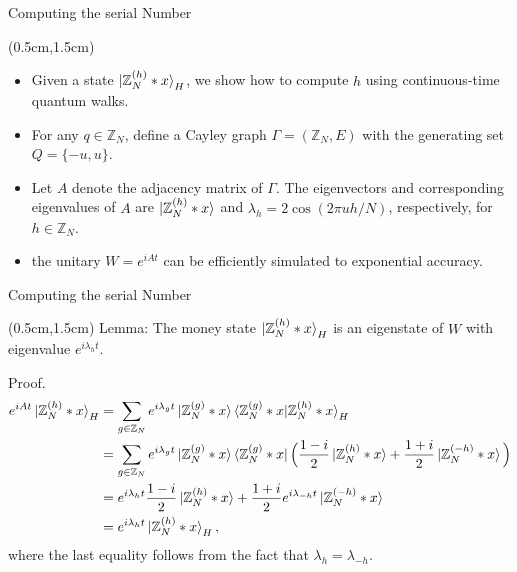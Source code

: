 \documentclass{beamer}
\theoremstyle{definition}
\begin{document}
\begin{frame}{Computing the serial Number}

    \begin{textblock*}{12cm}(0.5cm,1.5cm)

        \begin{itemize}
            \item Given a state $\ket{\mathbb{Z}_N^{(h)} * x}_H$, we show how to compute $h$ using continuous-time quantum walks.
            \vspace{0.5cm}
            \item For any $q \in \mathbb{Z}_N$, define a Cayley graph $\Gamma = (\mathbb{Z}_N, E)$ with the generating set $Q = \{-u, u\}$.
            \vspace{0.5cm}
            \item Let $A$ denote the adjacency matrix of $\Gamma$. The eigenvectors and corresponding eigenvalues of $A$ are $\ket{\mathbb{Z}_N^{(h)} * x}$ and $\lambda_h = 2\cos(2\pi uh / N)$, respectively, for $h \in \mathbb{Z}_N$.
            \vspace{0.5cm}
            \item the unitary $W = e^{iAt}$ can be efficiently simulated to exponential accuracy.
        \end{itemize}


    \end{textblock*}

 \end{frame}



\begin{frame}{Computing the serial Number}

    \begin{textblock*}{12cm}(0.5cm,1.5cm)
        Lemma: The money state $\ket{\mathbb{Z}_N^{(h)} * x}_H$ is an eigenstate of $W$ with eigenvalue $e^{i\lambda_h t}$.
        \vspace{1cm}
        

        Proof. 
        \begin{align*}
            e^{iAt} \ket{\mathbb{Z}_N^{(h)} * x}_H
            & = \sum_{g \in \mathbb{Z}_N} e^{i\lambda_gt} \ket{\mathbb{Z}_N^{(g)} * x}\braket{\mathbb{Z}_N^{(g)} * x|\mathbb{Z}_N^{(h)} * x}_H \\
            & = \sum_{g \in \mathbb{Z}_N} e^{i\lambda_gt} \ket{\mathbb{Z}_N^{(g)} * x} \bra{\mathbb{Z}_N^{(g)} * x} \Big( \frac{1 - i}{2} \ket{\mathbb{Z}_N^{(h)} * x} + \frac{1 + i}{2} \ket{\mathbb{Z}_N^{(-h)} * x} \Big) \\
            & = e^{i\lambda_{h}t} \frac{1 - i}{2} \ket{\mathbb{Z}_N^{(h)} * x} + \frac{1 + i}{2} e^{i\lambda_{-h}t} \ket{\mathbb{Z}_N^{(-h)} * x} \\
            & = e^{i\lambda_{h}t} \ket{\mathbb{Z}_N^{(h)} * x}_H,
        \end{align*}
        where the last equality follows from the fact that $\lambda_h = \lambda_{-h}$.
    \end{textblock*}

 \end{frame}
\end{document}
